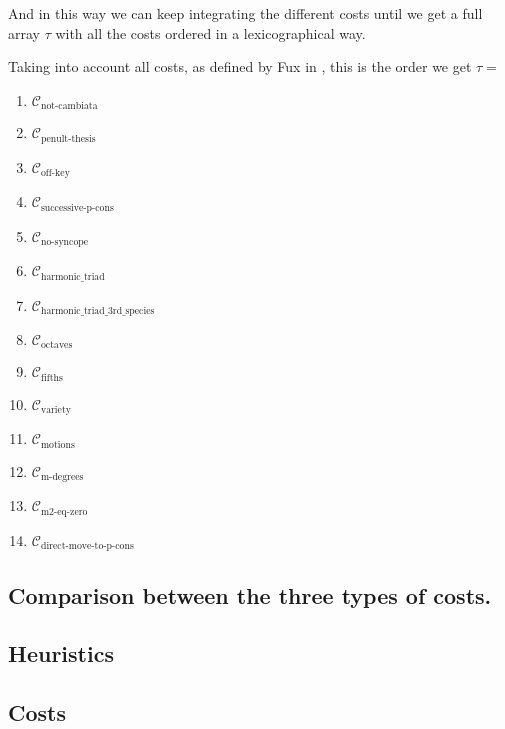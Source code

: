 And in this way we can keep integrating the different costs until we get a full array $\tau$ with all the costs ordered in a lexicographical way.

Taking into account all costs, as defined by Fux in \gap, this is the order we get $\tau =$
\begin{multicols}{3}
    \begin{enumerate}
        \item $\mathcal{C}_\text{not-cambiata}$
        \item $\mathcal{C}_\text{penult-thesis}$
        \item $\mathcal{C}_\text{off-key}$
        \item $\mathcal{C}_\text{successive-p-cons}$
        \item $\mathcal{C}_\text{no-syncope}$
        \item $\mathcal{C}_\text{harmonic\_triad}$
        \item $\mathcal{C}_\text{harmonic\_triad\_3rd\_species}$
        \item $\mathcal{C}_\text{octaves}$
        \item $\mathcal{C}_\text{fifths}$
        \item $\mathcal{C}_\text{variety}$
        \item $\mathcal{C}_\text{motions}$
        \item $\mathcal{C}_\text{m-degrees}$
        \item $\mathcal{C}_\text{m2-eq-zero}$
        \item $\mathcal{C}_\text{direct-move-to-p-cons}$
    \end{enumerate}
\end{multicols}
    

\subsection*{Comparison between the three types of costs.}

\begin{table}[ht]
    \centering
    \caption{Comparison of Options A, B, and C}
    \label{tab:comparison}
\end{table}


\subsection{Heuristics}

\subsection{Costs} \label{costs}